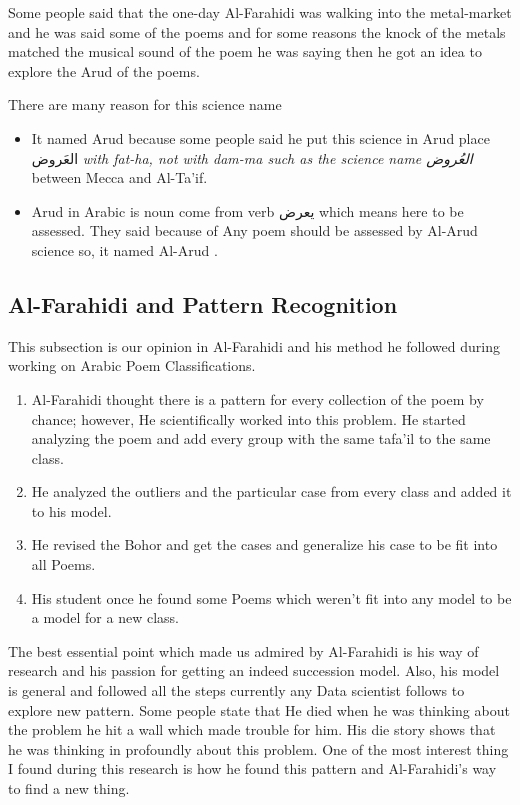   Some people said that the one-day Al-Farahidi was walking into the metal-market and he was said some of the poems and for some reasons the knock of the metals matched the musical sound of the poem he was saying then he got an idea to explore the Arud of the poems.

 There are many reason for this science name 
  \begin{itemize}
  \item It named Arud because some people said he put this science in Arud place \textarabic{العَروض} \textit{with fat-ha, not with dam-ma such as the science name \textarabic{العُروض} } between Mecca and Al-Ta'if\cite{AlQuaed}.
  \item Arud in Arabic is noun come from verb \textarabic{يعرض} which means here to be assessed. They said because of Any poem should be assessed by Al-Arud science so, it named Al-Arud \cite{Alkafi1994}.
  \end{itemize}
  
  

  
    \newpage
    \subsection{Al-Farahidi and Pattern Recognition}
    This subsection is our opinion in Al-Farahidi and his method he followed during working on Arabic Poem Classifications.

\begin{enumerate}


\item Al-Farahidi thought there is a pattern for every collection of the poem by chance; however, He scientifically worked into this problem. He started analyzing the poem and add every group with the same tafa'il to the same class.
\item He analyzed the outliers and the particular case from every class and added it to his model.
\item He revised the Bohor and get the cases and generalize his case to be fit into all Poems.
\item His student once he found some Poems which weren't fit into any model to be a model for a new class.

\end{enumerate}
The best essential point which made us admired by Al-Farahidi is his way of research and his passion for getting an indeed succession model. Also, his model is general and followed all the steps currently any Data scientist follows to explore new pattern. Some people state that He died when he was thinking about the problem he hit a wall which made trouble for him. His die story shows that he was thinking in profoundly about this problem. One of the most interest thing I found during this research is how he found this pattern and Al-Farahidi’s way to find a new thing.

